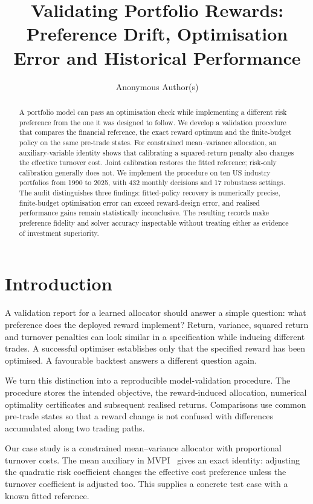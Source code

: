 \documentclass[sigconf,anonymous,review]{acmart}
\title{Validating Portfolio Rewards: Preference Drift, Optimisation Error and Historical Performance}
\author{Anonymous Author(s)}
\begin{document}
\begin{abstract}
A portfolio model can pass an optimisation check while implementing a different risk preference from the one it was designed to follow. We develop a validation procedure that compares the financial reference, the exact reward optimum and the finite-budget policy on the same pre-trade states. For constrained mean--variance allocation, an auxiliary-variable identity shows that calibrating a squared-return penalty also changes the effective turnover cost. Joint calibration restores the fitted reference; risk-only calibration generally does not. We implement the procedure on ten US industry portfolios from 1990 to 2025, with 432 monthly decisions and 17 robustness settings. The audit distinguishes three findings: fitted-policy recovery is numerically precise, finite-budget optimisation error can exceed reward-design error, and realised performance gains remain statistically inconclusive. The resulting records make preference fidelity and solver accuracy inspectable without treating either as evidence of investment superiority.
\end{abstract}
\maketitle

\section{Introduction}
A validation report for a learned allocator should answer a simple question: what preference does the deployed reward implement? Return, variance, squared return and turnover penalties can look similar in a specification while inducing different trades. A successful optimiser establishes only that the specified reward has been optimised. A favourable backtest answers a different question again.

We turn this distinction into a reproducible model-validation procedure. The procedure stores the intended objective, the reward-induced allocation, numerical optimality certificates and subsequent realised returns. Comparisons use common pre-trade states so that a reward change is not confused with differences accumulated along two trading paths.

Our case study is a constrained mean--variance allocator with proportional turnover costs. The mean auxiliary in MVPI\ \cite{zhang2021} gives an exact identity: adjusting the quadratic risk coefficient changes the effective cost preference unless the turnover coefficient is adjusted too. This supplies a concrete test case with a known fitted reference.
\end{document}
